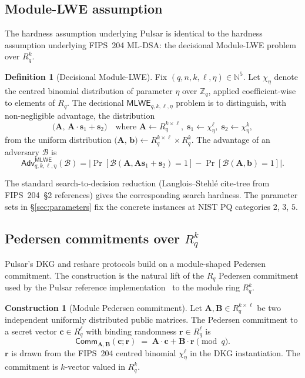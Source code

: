 \documentclass[11pt,a4paper]{article}
\theoremstyle{definition}
\newtheorem{definition}{Definition}
\newtheorem{construction}{Construction}
\theoremstyle{remark}
\newcommand{\Rq}{R_q}
\newcommand{\Zq}{\mathbb{Z}_q}
\newcommand{\Adv}{\mathsf{Adv}}
\newcommand{\MLWE}{\mathsf{MLWE}}
\newcommand{\Comm}{\mathsf{Comm}}
\begin{document}
\subsection{Module-LWE assumption}
\label{sec:prelim-mlwe}

The hardness assumption underlying Pulsar is identical to the
hardness assumption underlying FIPS~204 ML-DSA: the decisional
Module-LWE problem over $\Rq^k$.

\begin{definition}[Decisional Module-LWE]
\label{def:mlwe}
Fix $(q, n, k, \ell, \eta) \in \mathbb{N}^5$. Let $\chi_\eta$ denote the
centred binomial distribution of parameter $\eta$ over $\Zq$, applied
coefficient-wise to elements of $\Rq$. The decisional
$\MLWE_{q, k, \ell, \eta}$ problem is to distinguish, with
non-negligible advantage, the distribution
\[
\bigl(\mathbf{A},\,\mathbf{A} \cdot \mathbf{s}_1 + \mathbf{s}_2\bigr)
\quad \text{where } \mathbf{A} \gets \Rq^{k \times \ell},\;
\mathbf{s}_1 \gets \chi_\eta^\ell,\;
\mathbf{s}_2 \gets \chi_\eta^k,
\]
from the uniform distribution
$\bigl(\mathbf{A},\,\mathbf{b}\bigr) \gets \Rq^{k \times \ell} \times \Rq^k$.
The advantage of an adversary $\mathcal{B}$ is
\[
\Adv^{\MLWE}_{q, k, \ell, \eta}(\mathcal{B})
=
\bigl|\Pr[\mathcal{B}(\mathbf{A}, \mathbf{A}\mathbf{s}_1+\mathbf{s}_2) = 1]
- \Pr[\mathcal{B}(\mathbf{A}, \mathbf{b}) = 1]\bigr|.
\]
\end{definition}

The standard search-to-decision reduction (Langlois--Stehl\'e
\cite{lattice-estimator} cite-tree from FIPS~204~\S2 references) gives
the corresponding search hardness. The parameter sets in
\S\ref{sec:parameters} fix the concrete instances at NIST PQ
categories $2$, $3$, $5$.

\subsection{Pedersen commitments over $\Rq^k$}
\label{sec:prelim-pedersen}

Pulsar's DKG and reshare protocols build on a module-shaped
Pedersen commitment. The construction is the natural lift of the
$\Rq$ Pedersen commitment used by the Pulsar reference
implementation~\cite{boschini2024ringtail} to the module
ring $\Rq^k$.

\begin{construction}[Module Pedersen commitment]
\label{con:pedersen}
Let $\mathbf{A}, \mathbf{B} \in \Rq^{k \times \ell}$ be two independent
uniformly distributed public matrices. The Pedersen commitment to a
secret vector $\mathbf{c} \in \Rq^\ell$ with binding randomness
$\mathbf{r} \in \Rq^\ell$ is
\[
\Comm_{\mathbf{A}, \mathbf{B}}(\mathbf{c}; \mathbf{r}) \;=\;
\mathbf{A} \cdot \mathbf{c} + \mathbf{B} \cdot \mathbf{r} \pmod q.
\]
$\mathbf{r}$ is drawn from the FIPS~204 centred binomial $\chi_\eta^\ell$ in
the DKG instantiation. The commitment is $k$-vector valued in
$\Rq^k$.
\end{construction}
\end{document}
